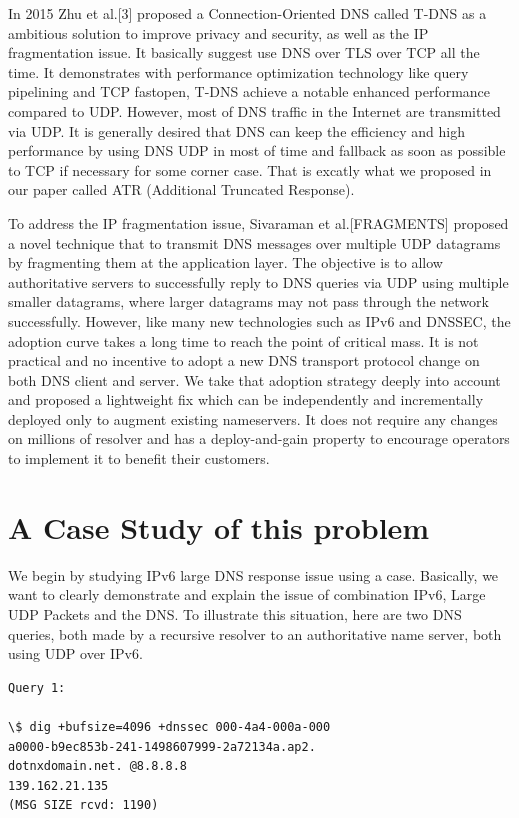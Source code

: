 In 2015 Zhu et al.[3] proposed a Connection-Oriented DNS called T-DNS 
as a ambitious solution to improve privacy and security, as well as the 
IP fragmentation issue. It basically suggest use DNS over TLS over TCP 
all the time. It demonstrates with performance optimization technology 
like query pipelining and TCP fastopen, T-DNS achieve a notable enhanced
performance compared to UDP. However, most of DNS traffic in the Internet 
are transmitted via UDP. It is generally desired that DNS can keep the 
efficiency and high performance by using DNS UDP in most of time and 
fallback as soon as possible to TCP if necessary for some corner case. 
That is excatly what we proposed in our paper called ATR (Additional 
Truncated Response). 

To address the IP fragmentation issue, Sivaraman et al.[FRAGMENTS] 
proposed a novel technique that to transmit DNS messages over multiple 
UDP datagrams by fragmenting them at the application layer. 
The objective is to allow authoritative servers to successfully reply 
to DNS queries via UDP using multiple smaller datagrams, where larger 
datagrams may not pass through the network successfully. However, like 
many new technologies such as IPv6 and DNSSEC, the adoption curve takes 
a long time to reach the point of critical mass. It is not practical 
and no incentive to adopt a new DNS transport protocol change on both 
DNS client and server. We take that adoption strategy deeply into 
account and proposed a lightweight fix which can be independently 
and incrementally deployed only to augment existing nameservers. It does 
not require any changes on millions of resolver and has a deploy-and-gain 
property to encourage operators to implement it to benefit their customers.

\section{A Case Study of this problem}

We begin by studying IPv6 large DNS response issue using a
case. Basically, we want to clearly demonstrate and explain
the issue of combination IPv6, Large UDP Packets and the DNS.
To illustrate this situation, here are two DNS queries,
both made by a recursive resolver to an authoritative
name server, both using UDP over IPv6.

\begin{verbatim}
Query 1:

\$ dig +bufsize=4096 +dnssec 000-4a4-000a-000
a0000-b9ec853b-241-1498607999-2a72134a.ap2.
dotnxdomain.net. @8.8.8.8
139.162.21.135
(MSG SIZE rcvd: 1190)
\end{verbatim}

